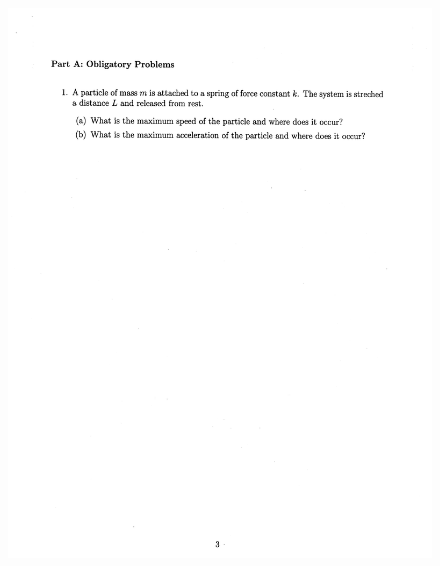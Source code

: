 \documentclass[10pt,a4paper]{article}
\begin{document}
\begin{figure}[H]
 \centering
 \includegraphics[width=16cm]{pdf/1-1T42.png}
\end{figure}
 \newpage
\end{document}
